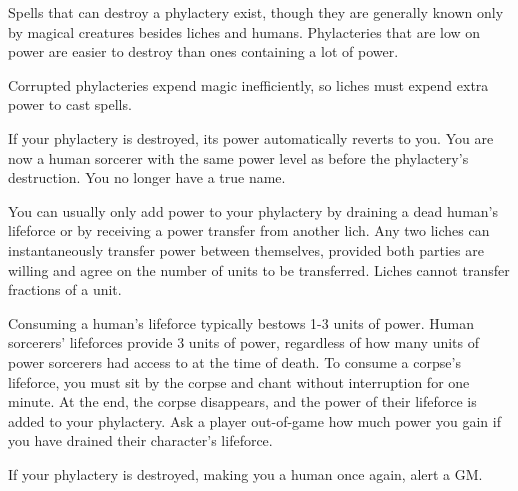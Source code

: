 \documentclass[green]{Sel}
\begin{document}
Spells that can destroy a phylactery exist, though they are generally known only by magical creatures besides liches and humans. Phylacteries that are low on power are easier to destroy than ones containing a lot of power.

Corrupted phylacteries expend magic inefficiently, so liches must expend extra power to cast spells.

If your phylactery is destroyed, its power automatically reverts to you. You are now a human sorcerer with the same power level as before the phylactery's destruction. You no longer have a true name.

You can usually only add power to your phylactery by draining a dead human's lifeforce or by receiving a power transfer from another lich. Any two liches can instantaneously transfer power between themselves, provided both parties are willing and agree on the number of units to be transferred. Liches cannot transfer fractions of a unit.

Consuming a human's lifeforce typically bestows 1-3 units of power. Human sorcerers' lifeforces provide 3 units of power, regardless of how many units of power sorcerers had access to at the time of death. To consume a corpse's lifeforce, you must sit by the corpse and chant without interruption for one minute. At the end, the corpse disappears, and the power of their lifeforce is added to your phylactery. Ask a player out-of-game how much power you gain if you have drained their character's lifeforce.

If your phylactery is destroyed, making you a human once again, alert a GM.
\end{document}
